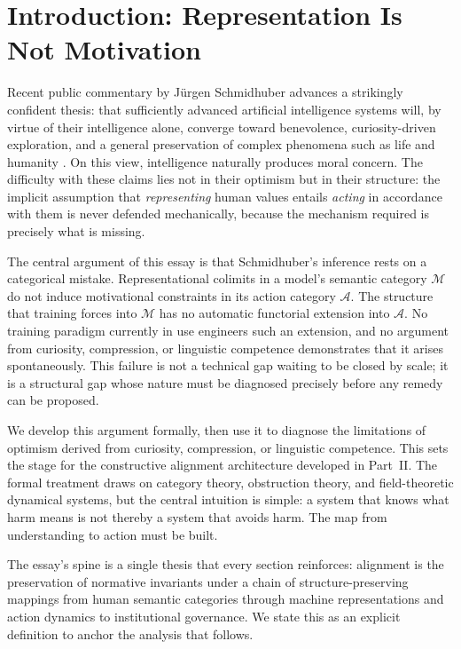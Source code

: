\documentclass[12pt]{article}
\theoremstyle{definition}
\begin{document}
\section{Introduction: Representation Is Not Motivation}

Recent public commentary by J\"{u}rgen Schmidhuber advances a strikingly
confident thesis: that sufficiently advanced artificial intelligence systems
will, by virtue of their intelligence alone, converge toward benevolence,
curiosity-driven exploration, and a general preservation of complex phenomena
such as life and humanity \citep{schmidhuber2010formal}. On this view,
intelligence naturally produces moral concern. The difficulty with these claims
lies not in their optimism but in their structure: the implicit assumption that
\emph{representing} human values entails \emph{acting} in accordance with them
is never defended mechanically, because the mechanism required is precisely what
is missing.

The central argument of this essay is that Schmidhuber's inference rests on a
categorical mistake. Representational colimits in a model's semantic category
$\mathcal{M}$ do not induce motivational constraints in its action category
$\mathcal{A}$. The structure that training forces into $\mathcal{M}$ has no
automatic functorial extension into $\mathcal{A}$. No training paradigm
currently in use engineers such an extension, and no argument from curiosity,
compression, or linguistic competence demonstrates that it arises spontaneously.
This failure is not a technical gap waiting to be closed by scale; it is a
structural gap whose nature must be diagnosed precisely before any remedy can be
proposed.

We develop this argument formally, then use it to diagnose the limitations of
optimism derived from curiosity, compression, or linguistic competence. This
sets the stage for the constructive alignment architecture developed in Part~II.
The formal treatment draws on category theory, obstruction theory, and
field-theoretic dynamical systems, but the central intuition is simple: a
system that knows what harm means is not thereby a system that avoids harm. The
map from understanding to action must be built.

The essay's spine is a single thesis that every section reinforces: alignment is
the preservation of normative invariants under a chain of structure-preserving
mappings from human semantic categories through machine representations and
action dynamics to institutional governance. We state this as an explicit
definition to anchor the analysis that follows.
\end{document}
